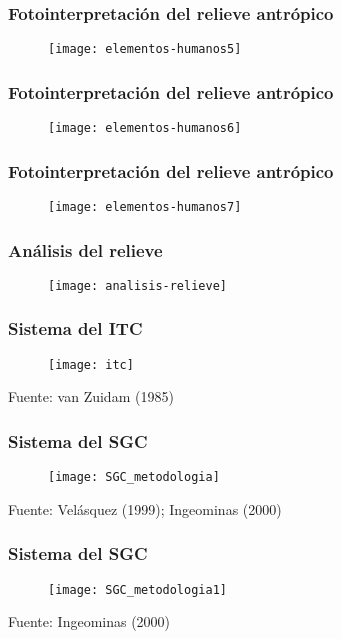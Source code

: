\documentclass[14pt]{beamer}
\begin{document}
  \begin{frame}
\frametitle{Fotointerpretación del relieve antrópico}
 \begin{figure}
    \centering
    \texttt{[image: elementos-humanos5]}
  \end{figure}
\end{frame}
  \begin{frame}
\frametitle{Fotointerpretación del relieve antrópico}
 \begin{figure}
    \centering
    \texttt{[image: elementos-humanos6]}
  \end{figure}
\end{frame}
  \begin{frame}
\frametitle{Fotointerpretación del relieve antrópico}
 \begin{figure}
    \centering
    \texttt{[image: elementos-humanos7]}
  \end{figure}
\end{frame}
  \begin{frame}
\frametitle{Análisis del relieve}
 \begin{figure}
    \centering
    \texttt{[image: analisis-relieve]}
  \end{figure}
\end{frame}
  \begin{frame}
\frametitle{Sistema del ITC}
 \begin{figure}
    \centering
    \texttt{[image: itc]}
  \end{figure}
  \tiny{Fuente: van Zuidam (1985)}
\end{frame}
  \begin{frame}
\frametitle{Sistema del SGC}
 \begin{figure}
    \centering
    \texttt{[image: SGC\_metodologia]}
  \end{figure}
  \tiny{Fuente: Velásquez (1999); Ingeominas (2000)}
\end{frame}
  \begin{frame}
\frametitle{Sistema del SGC}
 \begin{figure}
    \centering
    \texttt{[image: SGC\_metodologia1]}
  \end{figure}
  \tiny{Fuente: Ingeominas (2000)}
\end{frame}
\end{document}
